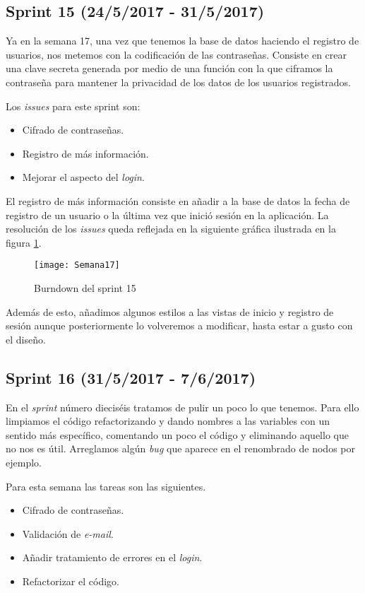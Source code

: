 \subsection{Sprint 15 (24/5/2017 - 31/5/2017)}

Ya en la semana 17, una vez que tenemos la base de datos haciendo el registro de usuarios, nos metemos con la codificación de las contraseñas. Consiste en crear una clave secreta generada por medio de una función con la que ciframos la contraseña para mantener la privacidad de los datos de los usuarios registrados. 

Los \emph{issues} para este sprint son:
\begin{itemize}
\item Cifrado de contraseñas.
\item Registro de más información.
\item Mejorar el aspecto del \emph{login}.
\end{itemize}

El registro de más información consiste en añadir a la base de datos la fecha de registro de un usuario o la última vez que inició sesión en la aplicación. La resolución de los \emph{issues} queda reflejada en la siguiente gráfica ilustrada en la figura \ref{fig:A.14}.

\begin{figure}[h]
\centering
\texttt{[image: Semana17]}
\caption{Burndown del sprint 15}
\label{fig:A.14}
\end{figure}

Además de esto, añadimos algunos estilos a las vistas de inicio y registro de sesión aunque posteriormente lo volveremos a modificar, hasta estar a gusto con el diseño.

\subsection{Sprint 16 (31/5/2017 - 7/6/2017)}

En el \emph{sprint} número dieciséis tratamos de pulir un poco lo que tenemos. Para ello limpiamos el código refactorizando y dando nombres a las variables con un sentido más específico, comentando un poco el código y eliminando aquello que no nos es útil. Arreglamos algún \emph{bug} que aparece en el renombrado de nodos por ejemplo.


Para esta semana las tareas son las siguientes.
\begin{itemize}
\item Cifrado de contraseñas.
\item Validación de \emph{e-mail}.
\item Añadir tratamiento de errores en el \emph{login}.
\item Refactorizar el código.
\end{itemize}

